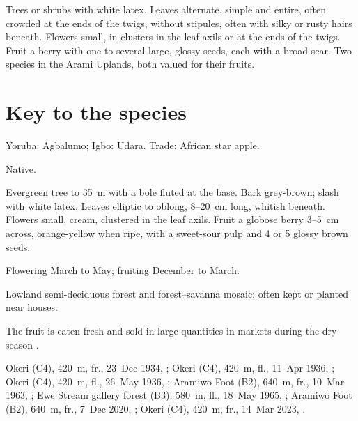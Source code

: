 \label{fam:sapotaceae}

Trees or shrubs with white latex. Leaves alternate, simple and entire,
often crowded at the ends of the twigs, without stipules, often with
silky or rusty hairs beneath. Flowers small, in clusters in the leaf
axils or at the ends of the twigs. Fruit a berry with one to several
large, glossy seeds, each with a broad scar. Two species in the Arami
Uplands, both valued for their fruits.

\section*{Key to the species}
\begin{florakey}
\end{florakey}

\label{sp:SAP01}

 Yoruba: Agbalumo; Igbo: Udara. Trade:
African star apple.

 Native.

 Evergreen tree to 35~m with a bole fluted at the
base. Bark grey-brown; slash with white latex. Leaves elliptic to
oblong, 8--20~cm long, whitish beneath. Flowers small, cream,
clustered in the leaf axils. Fruit a globose berry 3--5~cm across,
orange-yellow when ripe, with a sweet-sour pulp and 4 or 5 glossy
brown seeds.

 Flowering March to May; fruiting December to March.

 Lowland semi-deciduous forest and forest--savanna
mosaic; often kept or planted near houses.

 The fruit is eaten fresh and sold in large quantities in
markets during the dry season \citep{keay1989,orwa2009}.

 Okeri (C4), 420~m, fr., 23~Dec 1934, ;
Okeri (C4), 420~m, fl., 11~Apr 1936, ;
Okeri (C4), 420~m, fl., 26~May 1936, ;
Aramiwo Foot (B2), 640~m, fr., 10~Mar 1963, ;
Ewe Stream gallery forest (B3), 580~m, fl., 18~May 1965, ;
Aramiwo Foot (B2), 640~m, fr., 7~Dec 2020, ;
Okeri (C4), 420~m, fr., 14~Mar 2023, .

